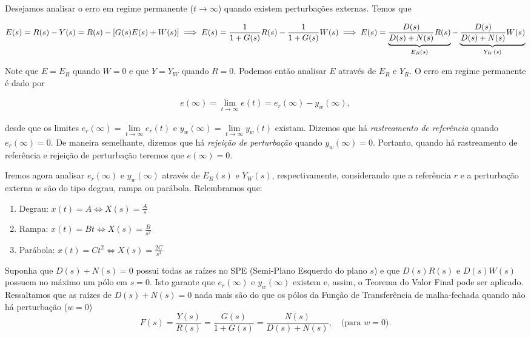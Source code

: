 \documentclass[
]{book}
\providecommand{\tightlist}{%
  \setlength{\itemsep}{0pt}\setlength{\parskip}{0pt}}
\begin{document}
Desejamos analisar o erro em regime permanente (\(t \to \infty\)) quando existem perturbações externas. Temos que

\[
E(s) = R(s) - Y(s) = R(s) - [G(s)E(s) + W(s)]\\
\implies E(s) = \frac {1}{1 + G(s)}R(s) - \frac {1}{1+G(s)}W(s) \\
\implies E(s) = \underbrace{\frac {D(s)}{D(s) + N(s)}R(s)}_{E_R(s)} - \underbrace{\frac {D(s)}{D(s) + N(s)}W(s)}_{Y_W(s)}
\]

Note que \(E = E_R\) quando \(W= 0\) e que \(Y = Y_W\) quando \(R=0\). Podemos então analisar \(E\) através de \(E_R\) e \(Y_R\). O erro em regime permanente é dado por

\begin{align}
e(\infty) = \lim\limits_{t \to \infty}{e(t)} = e_r(\infty) - y_w(\infty), \label{eq:eq41}
\end{align}

desde que os limites \(e_r(\infty) = \lim\limits_{t\to \infty}{e_r(t)}\) e \(y_w(\infty) = \lim\limits_{t \to \infty}{y_w(t)}\) existam. Dizemos que há \emph{rastreamento de referência} quando \(e_r(\infty) = 0\). De maneira semelhante, dizemos que há \emph{rejeição de perturbação} quando \(y_w(\infty) = 0\). Portanto, quando há rastreamento de referência e rejeição de perturbação teremos que \(e(\infty) = 0\).

Iremos agora analisar \(e_r(\infty)\) e \(y_w(\infty)\) através de \(E_R(s)\) e \(Y_W(s)\), respectivamente, considerando que a referência \(r\) e a perturbação externa \(w\) são do tipo degrau, rampa ou parábola. Relembramos que:

\begin{enumerate}
\def\labelenumi{\arabic{enumi}.}
\tightlist
\item
  Degrau: \(x(t) = A \iff X(s) = \frac {A}{s}\)
\item
  Rampa: \(x(t) = Bt \iff X(s) = \frac {B}{s^2}\)
\item
  Parábola: \(x(t) = Ct^2 \iff X(s) = \frac {2C}{s^3}\)
\end{enumerate}

Suponha que \(D(s) + N(s) = 0\) possui todas as raízes no SPE (Semi-Plano Esquerdo do plano \(s\)) e que \(D(s)R(s)\) e \(D(s)W(s)\) possuem no máximo um pólo em \(s=0\). Isto garante que \(e_r(\infty)\) e \(y_w(\infty)\) existem e, assim, o Teorema do Valor Final pode ser aplicado. Ressaltamos que as raízes de \(D(s) + N(s) = 0\) nada mais são do que os pólos da Função de Transferência de malha-fechada quando não há perturbação (\(w=0\))
\[
F(s) = \frac {Y(s)}{R(s)} = \frac{G(s)}{1+G(s)} = \frac {N(s)}{D(s)+N(s)}, \quad \text{(para } w=0 \text{).} 
\]
\end{document}
